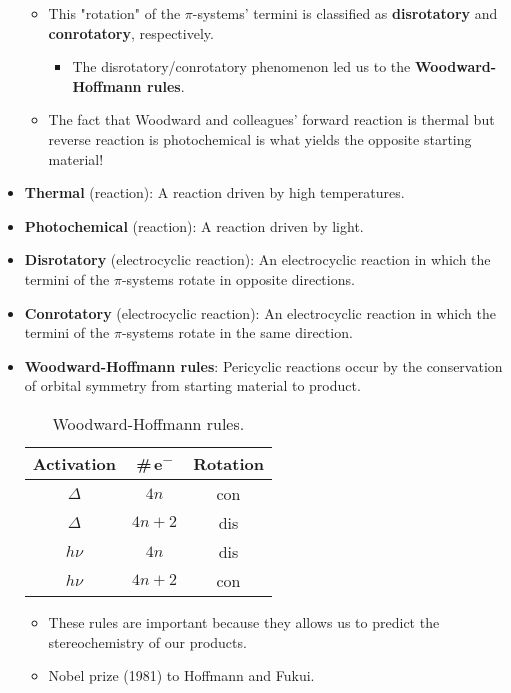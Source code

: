 \documentclass[../notes.tex]{subfiles}
\begin{document}
\begin{itemize}
\begin{itemize}
        \item This "rotation" of the $\pi$-systems' termini is classified as \textbf{disrotatory} and \textbf{conrotatory}, respectively.
        \begin{itemize}
            \item The disrotatory/conrotatory phenomenon led us to the \textbf{Woodward-Hoffmann rules}.
        \end{itemize}
        \item The fact that Woodward and colleagues' forward reaction is thermal but reverse reaction is photochemical is what yields the opposite starting material!
    \end{itemize}
    \item \textbf{Thermal} (reaction): A reaction driven by high temperatures.
    \item \textbf{Photochemical} (reaction): A reaction driven by light.
    \item \textbf{Disrotatory} (electrocyclic reaction): An electrocyclic reaction in which the termini of the $\pi$-systems rotate in opposite directions.
    \item \textbf{Conrotatory} (electrocyclic reaction): An electrocyclic reaction in which the termini of the $\pi$-systems rotate in the same direction.
    \item \textbf{Woodward-Hoffmann rules}: Pericyclic reactions occur by the conservation of orbital symmetry from starting material to product.
    \begin{table}[h!]
        \centering
        \small
        \renewcommand{\arraystretch}{1.2}
        \begin{tabular}{ccc}
            \textbf{Activation} & \textbf{\#\,e\textsuperscript{$\bm{-}$}} & \textbf{Rotation}\\
            \hline
            $\Delta$ & $4n$ & con\\
            $\Delta$ & $4n+2$ & dis\\
            $h\nu$ & $4n$ & dis\\
            $h\nu$ & $4n+2$ & con\\
        \end{tabular}
        \caption{Woodward-Hoffmann rules.}
        \label{tab:WHrules}
    \end{table}
    \begin{itemize}
        \item These rules are important because they allows us to predict the stereochemistry of our products.
        \item Nobel prize (1981) to Hoffmann and Fukui.

\end{itemize}
\end{itemize}
\end{document}
